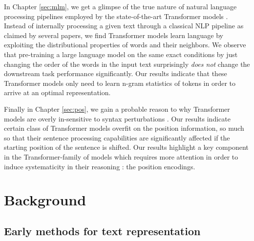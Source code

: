 \documentclass[letterpaper, 12pt]{report}
\begin{document}
In Chapter \autoref{sec:mlm}, we get a glimpse of the true nature of natural language processing pipelines employed by the state-of-the-art Transformer models \citep{sinha-etal-2021-masked}. Instead of internally processing a given text through a classical NLP pipeline as claimed by several papers, we find Transformer models learn language by exploiting the distributional properties of words and their neighbors. We observe that pre-training a large language model on the same exact conditions by just changing the order of the words in the input text surprisingly \textit{does not} change the downstream task performance significantly. Our results indicate that these Transformer models only need to learn n-gram statistics of tokens in order to arrive at an optimal representation.

Finally in Chapter \autoref{sec:pos}, we gain a probable reason to why Transformer models are overly in-sensitive to syntax perturbations \citep{sinha2022pos}. Our results indicate certain class of Transformer models overfit on the position information, so much so that their sentence processing capabilities are significantly affected if the starting position of the sentence is shifted. Our results highlight a key component in the Transformer-family of models which requires more attention in order to induce systematicity in their reasoning : the position encodings.

\clearpage

\chapter{Background}
\label{chap:background}


\section{Early methods for text representation}
\label{sec:bg_early_methods}
\end{document}
